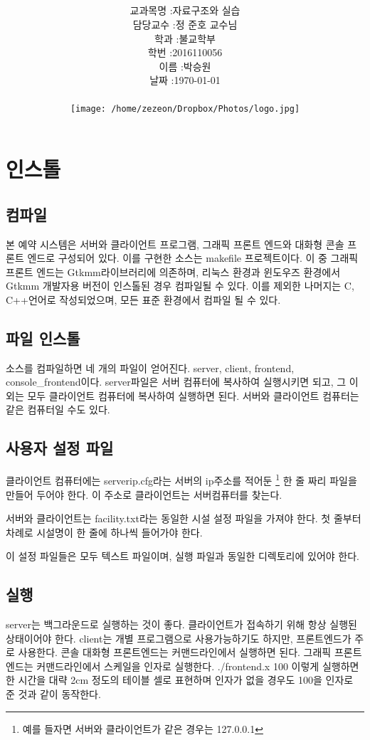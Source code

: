 \documentclass[12pt,a4paper]{report}
\title{
	\centering
	\pgfornament[width=12cm,color=teal]{84}\\
	\vspace{1cm}
	\fontsize{40}{40} \selectfont {소규모 사업자를 위한\\범용 예약 시스템 매뉴얼}
		\pgfornament[width=12cm,color=teal]{88}\\
	\vfill}
\author{
	\LARGE
	\begin{tabular}{rl}
		\hline
		교과목명 : & 자료구조와 실습\\
		담당교수 : & 정 준호 교수님\\
		학과 : & 불교학부 \\
		학번 : & 2016110056\\ 
		이름 : & 박승원\\
		날짜 : & \today\\
		\hline
	\end{tabular}\vspace{2cm}
	\\
\texttt{[image: /home/zezeon/Dropbox/Photos/logo.jpg]}
	}
\date{}
\begin{document}
\maketitle


\newpage
\tableofcontents

\noindent
\chapter{인스톨}
\section{컴파일}
본 예약 시스템은 서버와 클라이언트 프로그램, 그래픽 프론트 엔드와 대화형 콘솔 프론트 엔드로 구성되어 있다.
이를 구현한 소스는 makefile 프로젝트이다.
이 중 그래픽 프론트 엔드는 Gtkmm라이브러리에 의존하며, 리눅스 환경과 윈도우즈 환경에서  Gtkmm 개발자용 버전이 인스톨된 경우 컴파일될 수 있다.
이를 제외한 나머지는 C, C++언어로 작성되었으며, 모든 표준 환경에서 컴파일 될 수 있다.
\section{파일 인스톨}
소스를 컴파일하면 네 개의 파일이 얻어진다. server, client, frontend, console\_frontend이다. server파일은 서버 컴퓨터에 복사하여 실행시키면 되고, 그 이외는 모두 클라이언트 컴퓨터에 복사하여 실행하면 된다. 서버와 클라이언트 컴퓨터는 같은 컴퓨터일 수도 있다.
\section{사용자 설정 파일}
클라이언트 컴퓨터에는 serverip.cfg라는 서버의 ip주소를 적어둔
\footnote{예를 들자면 서버와 클라이언트가 같은 경우는 127.0.0.1} 
한 줄 짜리 파일을 만들어 두어야 한다. 
이 주소로 클라이언트는 서버컴퓨터를 찾는다. 

서버와 클라이언트는 facility.txt라는 동일한 시설 설정 파일을 가져야 한다.
첫 줄부터 차례로 시설명이 한 줄에 하나씩 들어가야 한다.

이 설정 파일들은 모두 텍스트 파일이며, 실행 파일과 동일한 디렉토리에 있어야 한다.
\section{실행}
server는 백그라운드로 실행하는 것이 좋다. 클라이언트가 접속하기 위해 항상 실행된 상태이어야 한다.
client는 개별 프로그램으로 사용가능하기도 하지만, 프론트엔드가 주로 사용한다.
콘솔 대화형 프론트엔드는 커맨드라인에서 실행하면 된다.
그래픽 프론트엔드는 커맨드라인에서 스케일을 인자로 실행한다. ./frontend.x 100 이렇게 실행하면 한 시간을 대략 2cm 정도의 테이블 셀로 표현하며 인자가 없을 경우도 100을 인자로 준 것과 같이 동작한다. 
\end{document}
